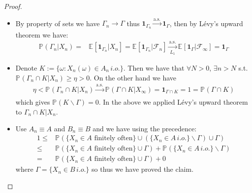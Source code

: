 \documentclass[11pt,a4paper]{article}
\numberwithin{equation}{section}%
\newcommand{\F}{\mathcal{F}}
\begin{document}
\begin{proof}
    \begin{itemize}[topsep=2pt,itemsep=0pt]
        \item By property of sets we have $ \Gamma _n \to \Gamma  $ thus $ \mathbf{1}_{\Gamma _n} \xrightarrow[]{\mathrm{a.s.}}  \mathbf{1}_{\Gamma } $, then by L\'evy's upward theorem we have:
        \begin{align*}
            \mathbb{P}_{  }\left( \Gamma _n  |X_n \right)  = & \mathbb{E}_{  }\left[ \mathbf{1}_{\Gamma _n} | X_n \right]=\mathbb{E}_{  }\left[ \mathbf{1}_{\Gamma _n} | \F_n \right] 
            \xrightarrow[L_1]{\mathrm{a.s.}}  \mathbb{E}_{  }\left[ \mathbf{1}_{\Gamma } | \F_\infty \right] 
            = \mathbf{1}_{\Gamma }
        \end{align*}
        \item Denote $ K:= \{\omega : X_n(\omega ) \in A_n \, i.o. \} $. Then we have that $ \forall N >0 $, $ \exists n>N $ s.t. $ \mathbb{P}_{  }\left( \Gamma _n \cap K | X_n  \right) \geq \eta >0 $. On the other hand we have
        \begin{align*}
            \eta < \mathbb{P}_{  }\left( \Gamma _n \cap K | X_n \right) \xrightarrow[]{\mathrm{a.s.}} \mathbb{P}_{  }\left( \Gamma \cap K | X_{\infty} \right) = \mathbf{1}_{\Gamma \cap K} = 1 = \mathbb{P}_{  }\left( \Gamma \cap K \right) 
        \end{align*}
        which gives $ \mathbb{P}_{  }\left( K \backslash \Gamma  \right) =0 $. In the above we applied L\'evy's upward theorem to $ \Gamma_n \cap K | X_n $.
        \item  Use $ A_n \equiv A $ and $ B_n \equiv B $ and we have using the precedence:
        \begin{align*}
            1 \leq & \mathbb{P}_{  }\left( \{X_n \in A \text{ finitely often} \} \cup (\{X_n \in A \,i.o. \}\backslash \Gamma ) \cup \Gamma   \right)\\
            \leq& \mathbb{P}_{  }\left( \{X_n \in A \text{ finitely often} \} \cup \Gamma   \right) + \mathbb{P}_{  }\left( \{X_n \in A \,i.o. \}\backslash \Gamma   \right)\\
            =& \mathbb{P}_{  }\left( \{X_n \in A \text{ finitely often} \} \cup \Gamma   \right) + 0
        \end{align*}
        where $ \Gamma =\{ X_n\in B \,i.o.\} $ so thus we have proved the claim.
        
    \end{itemize}
    
        
\end{proof}
\end{document}
